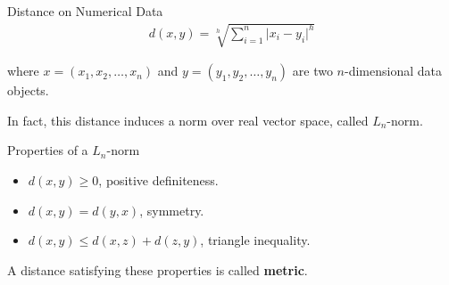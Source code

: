 \begin{frame}{Distance on Numerical Data}
	\vspace{-1.5em}
	\begin{align*}
		d(x,y) = \sqrt[h]{\sum_{i=1}^{n} \vert x_i-y_i \vert^h}
	\end{align*}

	where $x = (x_1,x_2, \ldots, x_n)$ and $y = (y_1,y_2,\ldots,y_n)$ are two $n$-dimensional data objects.

	In fact, this distance induces a norm over real vector space, called $L_n$-norm.

	\begin{block}{Properties of a $L_n$-norm}
		\begin{itemize}
			\item $d(x,y) \geq 0$, positive definiteness.
			\item $d(x,y) = d(y,x)$, symmetry.
			\item $d(x,y) \leq d(x,z) + d(z,y)$, triangle inequality.
		\end{itemize}

		A distance satisfying these properties is called \textbf{metric}.
	\end{block}
\end{frame}

